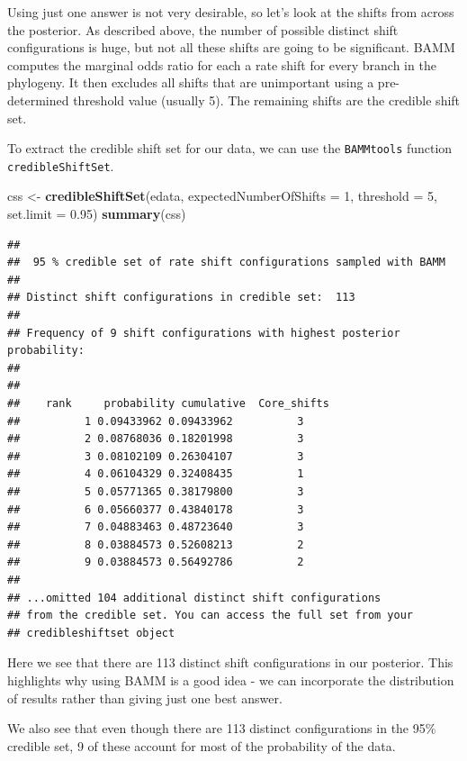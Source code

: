 \documentclass[]{book}
\newenvironment{Shaded}{\begin{snugshade}}{\end{snugshade}}
\newcommand{\KeywordTok}[1]{\textcolor[rgb]{0.13,0.29,0.53}{\textbf{{#1}}}}
\newcommand{\DataTypeTok}[1]{\textcolor[rgb]{0.13,0.29,0.53}{{#1}}}
\newcommand{\DecValTok}[1]{\textcolor[rgb]{0.00,0.00,0.81}{{#1}}}
\newcommand{\FloatTok}[1]{\textcolor[rgb]{0.00,0.00,0.81}{{#1}}}
\newcommand{\StringTok}[1]{\textcolor[rgb]{0.31,0.60,0.02}{{#1}}}
\newcommand{\NormalTok}[1]{{#1}}
\theoremstyle{definition}
\theoremstyle{definition}
\theoremstyle{definition}
\theoremstyle{remark}
\begin{document}
Using just one answer is not very desirable, so let's look at the shifts
from across the posterior. As described above, the number of possible
distinct shift configurations is huge, but not all these shifts are
going to be significant. BAMM computes the marginal odds ratio for each
a rate shift for every branch in the phylogeny. It then excludes all
shifts that are unimportant using a pre-determined threshold value
(usually 5). The remaining shifts are the credible shift set.

To extract the credible shift set for our data, we can use the
\texttt{BAMMtools} function \texttt{credibleShiftSet}.

\begin{Shaded}
\begin{Highlighting}[]
\NormalTok{css <-}\StringTok{ }\KeywordTok{credibleShiftSet}\NormalTok{(edata, }\DataTypeTok{expectedNumberOfShifts =} \DecValTok{1}\NormalTok{, }\DataTypeTok{threshold =} \DecValTok{5}\NormalTok{, }\DataTypeTok{set.limit =} \FloatTok{0.95}\NormalTok{)}
\KeywordTok{summary}\NormalTok{(css)}
\end{Highlighting}
\end{Shaded}

\begin{verbatim}
## 
##  95 % credible set of rate shift configurations sampled with BAMM
## 
## Distinct shift configurations in credible set:  113
## 
## Frequency of 9 shift configurations with highest posterior probability:
## 
## 
##    rank     probability cumulative  Core_shifts
##          1 0.09433962 0.09433962          3
##          2 0.08768036 0.18201998          3
##          3 0.08102109 0.26304107          3
##          4 0.06104329 0.32408435          1
##          5 0.05771365 0.38179800          3
##          6 0.05660377 0.43840178          3
##          7 0.04883463 0.48723640          3
##          8 0.03884573 0.52608213          2
##          9 0.03884573 0.56492786          2
## 
## ...omitted 104 additional distinct shift configurations
## from the credible set. You can access the full set from your 
## credibleshiftset object
\end{verbatim}

Here we see that there are 113 distinct shift configurations in our
posterior. This highlights why using BAMM is a good idea - we can
incorporate the distribution of results rather than giving just one best
answer.

We also see that even though there are 113 distinct configurations in
the 95\% credible set, 9 of these account for most of the probability of
the data.
\end{document}
